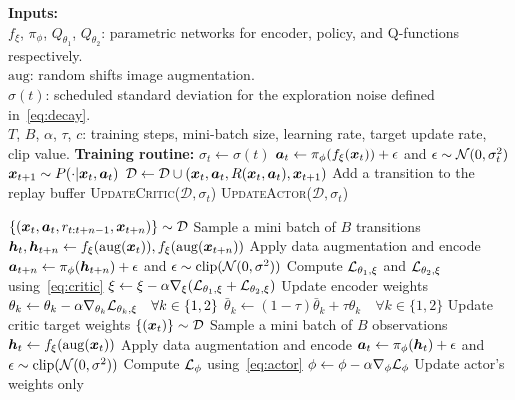 \begin{algorithmic}
  \State \textbf{Inputs:} \\
    $f_\xi$, $\pi_\phi$, $Q_{\theta_1}$, $Q_{\theta_2}$: parametric networks for encoder, policy, and Q-functions respectively.\\
    $\mathrm{aug}$: random shifts image augmentation.\\
    $\sigma(t)$: scheduled standard deviation for the exploration noise defined in~\cref{eq:decay}. \\
    $T$, $B$, $\alpha$, $\tau$, $c$: training steps, mini-batch size, learning rate, target update rate, clip value.
    \State \textbf{Training routine:}
    \State $\sigma_t \leftarrow \sigma(t)$ 
    \State  ${\bm{a}}_t \leftarrow \pi_\phi(f_\xi( {\bm{x}}_{t})) + \epsilon$ and $\epsilon \sim {\mathcal{N}}(0, \sigma_t^2)$ 
    \State  ${\bm{x}}_{t+1} \sim P(\cdot | {\bm{x}}_{t}, {\bm{a}}_t)$ 
    \State $\mathcal{D} \leftarrow \mathcal{D} \cup ({\bm{x}}_t, {\bm{a}}_t, R({\bm{x}}_t, {\bm{a}}_t), {\bm{x}}_{t+1})$ 
    \Comment Add a transition to the replay buffer
    \State \textsc{UpdateCritic}($\mathcal{D},\sigma_t$) 
    \State \textsc{UpdateActor}($\mathcal{D},\sigma_t$) 
    
    \EndFor
        \State $\{({\bm{x}}_t, {\bm{a}}_t, r_{t:t+n-1}, {\bm{x}}_{t+n})\} \sim \mathcal{D}$ \Comment Sample a mini batch of $B$ transitions
        \State ${\bm{h}}_t, {\bm{h}}_{t+n} \leftarrow f_\xi(\mathrm{aug}({\bm{x}}_t)), f_\xi(\mathrm{aug}({\bm{x}}_{t+n}))$ \Comment Apply data augmentation and encode
        \State ${\bm{a}}_{t+n} \leftarrow \pi_\phi({\bm{h}}_{t+n}) + \epsilon$ and $\epsilon \sim \mathrm{clip}({\mathcal{N}}(0, \sigma^2))$ 
        \State Compute ${\mathcal{L}}_{\theta_1, \xi}$ and  ${\mathcal{L}}_{\theta_2, \xi}$ using~\cref{eq:critic} 
        \State $\xi \leftarrow \xi -\alpha \nabla_\xi ({\mathcal{L}}_{\theta_1, \xi} + {\mathcal{L}}_{\theta_2, \xi})  $ \Comment Update encoder weights
        \State $\theta_k \leftarrow \theta_k -\alpha \nabla_{\theta_k} {\mathcal{L}}_{\theta_k, \xi} \quad \forall k \in \{1,2\}$ 
        \State $\bar{\theta}_k \leftarrow (1-\tau)\bar{\theta}_k + \tau  \theta_k \quad \forall k \in \{1,2\}$ \Comment Update critic target weights
    \EndProcedure
        \State $\{({\bm{x}}_t)\} \sim \mathcal{D}$ \Comment Sample a mini batch of $B$ observations
        \State ${\bm{h}}_t \leftarrow f_\xi(\mathrm{aug}({\bm{x}}_t))$ \Comment Apply data augmentation and encode
        \State ${\bm{a}}_{t} \leftarrow \pi_\phi({\bm{h}}_{t}) + \epsilon$ and $\epsilon \sim \mathrm{clip}({\mathcal{N}}(0, \sigma^2))$ 
        \State Compute ${\mathcal{L}}_{\phi}$ using~\cref{eq:actor} 
        \State $\phi \leftarrow \phi -\alpha \nabla_\phi {\mathcal{L}}_{\phi} $ \Comment Update actor's weights only
    \EndProcedure
\end{algorithmic}